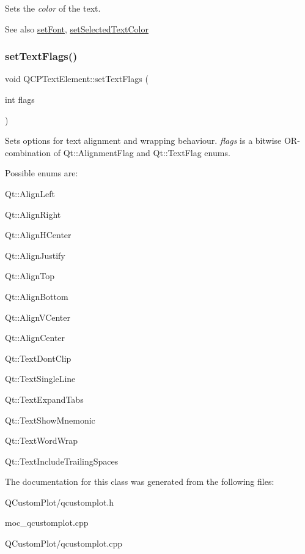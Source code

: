 Sets the {\itshape color} of the text.

\begin{DoxySeeAlso}{See also}
\mbox{\hyperlink{class_q_c_p_text_element_a09b3241769528fa87cb4bf35c97defad}{set\+Font}}, \mbox{\hyperlink{class_q_c_p_text_element_abaec200cae70a0eade53583defc0476d}{set\+Selected\+Text\+Color}} 
\end{DoxySeeAlso}
\mbox{\label{class_q_c_p_text_element_ab908f437f552020888a3ad8cf8242605}} 
\subsubsection{\texorpdfstring{set\+Text\+Flags()}{setTextFlags()}}
{\footnotesize\ttfamily void Q\+C\+P\+Text\+Element\+::set\+Text\+Flags (\begin{DoxyParamCaption}\item[{int}]{flags }\end{DoxyParamCaption})}

Sets options for text alignment and wrapping behaviour. {\itshape flags} is a bitwise O\+R-\/combination of {\ttfamily Qt\+::\+Alignment\+Flag} and {\ttfamily Qt\+::\+Text\+Flag} enums.

Possible enums are\+:
\begin{DoxyItemize}
\item Qt\+::\+Align\+Left
\item Qt\+::\+Align\+Right
\item Qt\+::\+Align\+H\+Center
\item Qt\+::\+Align\+Justify
\item Qt\+::\+Align\+Top
\item Qt\+::\+Align\+Bottom
\item Qt\+::\+Align\+V\+Center
\item Qt\+::\+Align\+Center
\item Qt\+::\+Text\+Dont\+Clip
\item Qt\+::\+Text\+Single\+Line
\item Qt\+::\+Text\+Expand\+Tabs
\item Qt\+::\+Text\+Show\+Mnemonic
\item Qt\+::\+Text\+Word\+Wrap
\item Qt\+::\+Text\+Include\+Trailing\+Spaces 
\end{DoxyItemize}

The documentation for this class was generated from the following files\+:\begin{DoxyCompactItemize}
\item 
Q\+Custom\+Plot/qcustomplot.\+h\item 
moc\+\_\+qcustomplot.\+cpp\item 
Q\+Custom\+Plot/qcustomplot.\+cpp\end{DoxyCompactItemize}
